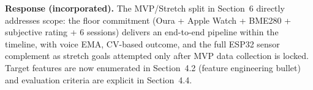 \documentclass[sigconf,nonacm]{acmart}
\begin{document}
\textbf{Response (incorporated).} The MVP/Stretch split in Section~6 directly addresses scope: the floor commitment (Oura + Apple Watch + BME280 + subjective rating + 6 sessions) delivers an end-to-end pipeline within the timeline, with voice EMA, CV-based outcome, and the full ESP32 sensor complement as stretch goals attempted only after MVP data collection is locked. Target features are now enumerated in Section~4.2 (feature engineering bullet) and evaluation criteria are explicit in Section~4.4.
\end{document}
